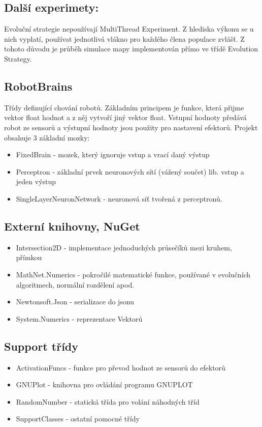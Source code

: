 \subsection{Další experimety:}
Evoluční strategie nepoužívají MultiThread Experiment. Z hlediska výkonu se u nich vyplatí, používat jednotlivá vlákno pro každého člena populace zvlášť. Z tohoto důvodu je průběh simulace mapy implementován přímo ve třídě Evolution Strategy. 
\subsection{RobotBrains} 
Třídy definující chování robotů. Základním principem je funkce, která přijme vektor float hodnot a  z něj vytvoří jiný vektor float. Vstupní hodnoty předává robot ze sensorů a výstupní hodnoty jsou použity pro nastavení efektorů. Projekt obsahuje 3 základní mozky:
\begin{itemize}
\item FixedBrain - mozek, který ignoruje vstup a vrací daný výstup 
\item Perceptron - základní prvek neuronových sítí (vážený součet)  lib. vstup a jeden výstup
\item SingleLayerNeuronNetwork - neuronová síť tvořená z perceptronů.
\end{itemize}

\subsection{Externí knihovny, NuGet}
\begin{itemize}
\item Intersection2D - implementace jednoduchých průsečíků mezi kruhem, přímkou 
\item MathNet.Numerics - pokročilé matematické funkce, používané v evolučních  algoritmech, normální rozdělení apod.
\item Newtonsoft.Json - serializace do jsonu
\item System.Numerics - reprezentace Vektorú

\end{itemize} 
\subsection{Support třídy} 
\begin{itemize}
\item ActivationFuncs - funkce pro převod hodnot ze sensorů do efektorů
\item GNUPlot - knihovna pro ovládání programu GNUPLOT 
\item RandomNumber  - statická třída pro volání náhodných tříd
\item SupportClasses - ostatní pomocné třídy

\end{itemize}

